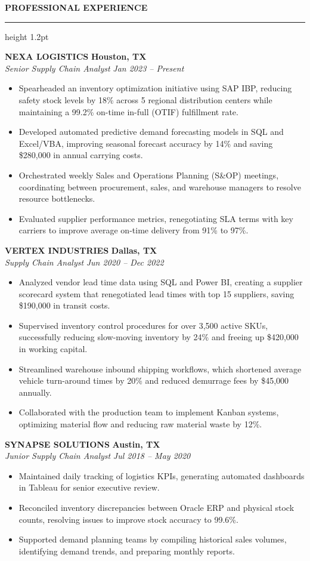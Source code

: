 \documentclass{article}
\newcommand{\resumesection}[1]{%
  \vspace{8pt}%
  {\color{primary}\large\bfseries\MakeUppercase{#1}}\\%
  \vspace{-6pt}%
  {\color{primary}\hrule height 1.2pt}%
  \vspace{6pt}%
}
\begin{document}
\resumesection{Professional Experience}

\textbf{NEXA LOGISTICS} \hfill \textbf{Houston, TX}\\
\textit{Senior Supply Chain Analyst} \hfill \textit{Jan 2023 -- Present}
\begin{itemize}
  \item Spearheaded an inventory optimization initiative using SAP IBP, reducing safety stock levels by 18\% across 5 regional distribution centers while maintaining a 99.2\% on-time in-full (OTIF) fulfillment rate.
  \item Developed automated predictive demand forecasting models in SQL and Excel/VBA, improving seasonal forecast accuracy by 14\% and saving \$280,000 in annual carrying costs.
  \item Orchestrated weekly Sales and Operations Planning (S\&OP) meetings, coordinating between procurement, sales, and warehouse managers to resolve resource bottlenecks.
  \item Evaluated supplier performance metrics, renegotiating SLA terms with key carriers to improve average on-time delivery from 91\% to 97\%.
\end{itemize}

\vspace{4pt}
\textbf{VERTEX INDUSTRIES} \hfill \textbf{Dallas, TX}\\
\textit{Supply Chain Analyst} \hfill \textit{Jun 2020 -- Dec 2022}
\begin{itemize}
  \item Analyzed vendor lead time data using SQL and Power BI, creating a supplier scorecard system that renegotiated lead times with top 15 suppliers, saving \$190,000 in transit costs.
  \item Supervised inventory control procedures for over 3,500 active SKUs, successfully reducing slow-moving inventory by 24\% and freeing up \$420,000 in working capital.
  \item Streamlined warehouse inbound shipping workflows, which shortened average vehicle turn-around times by 20\% and reduced demurrage fees by \$45,000 annually.
  \item Collaborated with the production team to implement Kanban systems, optimizing material flow and reducing raw material waste by 12\%.
\end{itemize}

\vspace{4pt}
\textbf{SYNAPSE SOLUTIONS} \hfill \textbf{Austin, TX}\\
\textit{Junior Supply Chain Analyst} \hfill \textit{Jul 2018 -- May 2020}
\begin{itemize}
  \item Maintained daily tracking of logistics KPIs, generating automated dashboards in Tableau for senior executive review.
  \item Reconciled inventory discrepancies between Oracle ERP and physical stock counts, resolving issues to improve stock accuracy to 99.6\%.
  \item Supported demand planning teams by compiling historical sales volumes, identifying demand trends, and preparing monthly reports.
\end{itemize}
\end{document}
